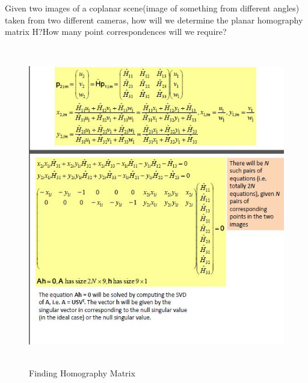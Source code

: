 \documentclass[a4paper,12pt,oneside]{book}
\begin{document}
Given two images of a coplanar scene(image of something from different angles) taken from two different cameras, how will we determine the planar homography matrix H?How many point correspondences will we require?
    \begin{figure}[h!]
		\includegraphics[width=1\linewidth, height=14cm]{Capture-1.JPG}
		\centering
		\caption{Finding Homography Matrix}
	\end{figure}\\
	
\end{document}
